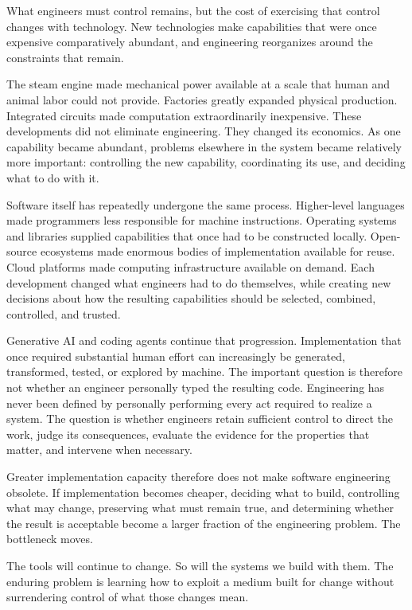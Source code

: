 What engineers must control remains, but the cost of exercising that control changes with technology.
New technologies make capabilities that were once expensive comparatively abundant, and engineering
reorganizes around the constraints that remain.

The steam engine made mechanical power available at a scale that human and animal labor could not
provide. Factories greatly expanded physical production. Integrated circuits made computation
extraordinarily inexpensive. These developments did not eliminate engineering. They changed its
economics. As one capability became abundant, problems elsewhere in the system became relatively more
important: controlling the new capability, coordinating its use, and deciding what to do with it.

Software itself has repeatedly undergone the same process. Higher-level languages made programmers less
responsible for machine instructions. Operating systems and libraries supplied capabilities that once
had to be constructed locally. Open-source ecosystems made enormous bodies of implementation available
for reuse. Cloud platforms made computing infrastructure available on demand. Each development changed
what engineers had to do themselves, while creating new decisions about how the resulting capabilities
should be selected, combined, controlled, and trusted.

Generative AI and coding agents continue that progression. Implementation that once required
substantial human effort can increasingly be generated, transformed, tested, or explored by machine.
The important question is therefore not whether an engineer personally typed the resulting code.
Engineering has never been defined by personally performing every act required to realize a system. The
question is whether engineers retain sufficient control to direct the work, judge its consequences,
evaluate the evidence for the properties that matter, and intervene when necessary.

Greater implementation capacity therefore does not make software engineering obsolete. If
implementation becomes cheaper, deciding what to build, controlling what may change, preserving what
must remain true, and determining whether the result is acceptable become a larger fraction of the
engineering problem. The bottleneck moves.

The tools will continue to change. So will the systems we build with them. The enduring problem is
learning how to exploit a medium built for change without surrendering control of what those changes
mean.

